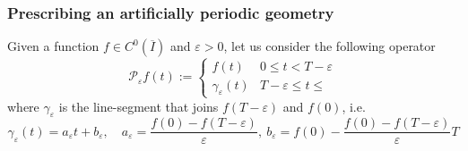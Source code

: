 \documentclass[10pt,a4paper]{article}
\numberwithin{equation}{section}
\begin{document}
\subsubsection*{Prescribing an artificially periodic geometry}
Given a function $f\in C^{0}(\overline{I})$ and $\varepsilon>0$,  let us consider the following operator 
\begin{equation}
\mathcal{P}_{\varepsilon}f\left(t\right):=\begin{cases}
f\left(t\right) & 0\le t<T-\varepsilon\\
\gamma_{\varepsilon}\left(t\right) & T-\varepsilon\le t\le 
\end{cases}
\end{equation}
where  $\gamma_{\varepsilon}$ is the line-segment that joins $f(T-\varepsilon)$ and $f(0)$, i.e.
\[
\gamma_{\varepsilon}\left(t\right)=a_{\varepsilon}t+b_{\varepsilon},\quad a_{\varepsilon}=\frac{f\left(0\right)-f\left(T-\varepsilon\right)}{\varepsilon},\ b_{\varepsilon}=f\left(0\right)-\frac{f\left(0\right)-f\left(T-\varepsilon\right)}{\varepsilon}T
\]
\end{document}
